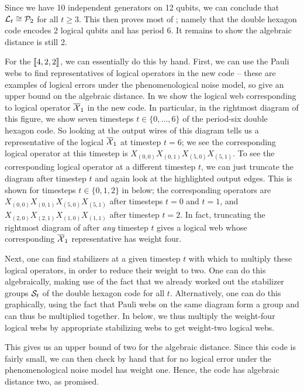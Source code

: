 Since we have 10 independent generators on 12 qubits, we can conclude that $\mathcal{L}_{t} \cong \mathcal{P}_2$ for all $t \geq 3$.
This then proves most of ;
namely that the double hexagon code encodes 2 logical qubits and has period 6.
It remains to show the algebraic distance is still 2.

For the $\llbracket4, 2, 2\rrbracket$, we can essentially do this by hand.
First, we can use the Pauli webs to find representatives of logical operators in the new code -- these are examples of logical errors under the phenomenological noise model, so give an upper bound on the algebraic distance.
In  we show the logical web corresponding to logical operator $\overline{\mathcal{X}}_1$ in the new code.
In particular, in the rightmost diagram of this figure, we show seven timesteps $t \in \{0, \ldots, 6\}$ of the period-six double hexagon code.
So looking at the output wires of this diagram tells us a representative of the logical $\overline{\mathcal{X}}_1$ at timestep $t=6$; we see the corresponding logical operator at this timestep is $X_{(0, 0)} X_{(0, 1)} X_{(5, 0)} X_{(5, 1)}$.
To see the corresponding logical operator at a different timestep $t$,
we can just truncate the diagram after timestep $t$ and again look at the highlighted output edges.
This is shown for timesteps $t \in \{0, 1, 2\}$ in  below;
the corresponding operators are
$X_{(0, 0)} X_{(0, 1)} X_{(5, 0)} X_{(5, 1)}$ after timesteps $t=0$ and $t=1$, and
$X_{(2, 0)} X_{(2, 1)} X_{(1, 0)} X_{(1, 1)}$ after timestep $t=2$.
In fact, truncating the rightmost diagram of  after \textit{any} timestep $t$
gives a logical web whose corresponding $\overline{\mathcal{X}}_1$ representative has weight four.

Next, one can find stabilizers at a given timestep $t$ with which to multiply these logical operators,
in order to reduce their weight to two.
One can do this algebraically,
making use of the fact that we already worked out the stabilizer groups $\mathcal{S}_t$ of the double hexagon code for all $t$.
Alternatively, one can do this graphically,
using the fact that Pauli webs on the same diagram form a group
and can thus be multiplied together.
In  below,
we thus multiply the weight-four logical webs by appropriate stabilizing webs
to get weight-two logical webs.

This gives us an upper bound of two for the algebraic distance.
Since this code is fairly small, we can then check by hand that for no logical error under the phenomenological noise model has weight one.
Hence, the code has algebraic distance two, as promised.

